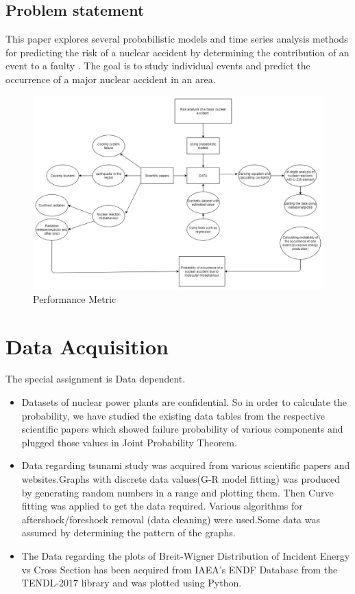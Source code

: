 \documentclass{article}
\begin{document}
\subsection{Problem statement}
This paper explores several probabilistic models and time series analysis methods for predicting the risk of a nuclear accident by determining the contribution of an event to a faulty   . The goal is to study individual events and predict the occurrence of a major nuclear accident in an area.
\begin{figure}
    \centering
  \includegraphics[scale=0.5]{Metric.jpg}
    \caption{Performance Metric}
    \label{fig:my_label}
\end{figure}


\section{Data Acquisition }
The special assignment is Data dependent. 
\begin{itemize}
    \item Datasets of nuclear power plants are confidential. So in order to calculate the probability, we have studied the existing data tables from the respective scientific papers\cite{cite9} which showed failure probability of various components and plugged those values in Joint Probability Theorem.
    \item Data regarding tsunami study was acquired from various scientific papers and websites.Graphs with discrete data values(G-R model fitting) was produced by generating random numbers in a range and plotting them. Then Curve fitting was applied to get the data required. Various algorithms for aftershock/foreshock removal (data cleaning)\cite{cite14} were used.Some data was assumed by determining the pattern of the graphs.
    \item The Data regarding the plots of Breit-Wigner Distribution of Incident Energy vs Cross Section has been acquired from IAEA's ENDF Database from the TENDL-2017 library\cite{cite15} and was plotted using Python.
\end{itemize}
\end{document}

